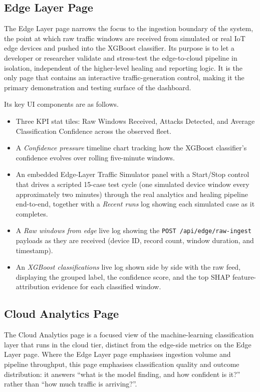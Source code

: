 \subsection{Edge Layer Page}\label{sec:dash_edge}

The Edge Layer page narrows the focus to the ingestion boundary of the system, the point at which raw traffic windows are received from simulated or real IoT edge devices and pushed into the XGBoost classifier. Its purpose is to let a developer or researcher validate and stress-test the edge-to-cloud pipeline in isolation, independent of the higher-level healing and reporting logic. It is the only page that contains an interactive traffic-generation control, making it the primary demonstration and testing surface of the dashboard.

Its key UI components are as follows.
\begin{itemize}
	\item Three KPI stat tiles: Raw Windows Received, Attacks Detected, and Average Classification Confidence across the observed fleet.
	\item A \textit{Confidence pressure} timeline chart tracking how the XGBoost classifier's confidence evolves over rolling five-minute windows.
	\item An embedded Edge-Layer Traffic Simulator panel with a Start/Stop control that drives a scripted 15-case test cycle (one simulated device window every approximately two minutes) through the real analytics and healing pipeline end-to-end, together with a \textit{Recent runs} log showing each simulated case as it completes.
	\item A \textit{Raw windows from edge} live log showing the \texttt{POST /api/edge/raw-ingest} payloads as they are received (device ID, record count, window duration, and timestamp).
	\item An \textit{XGBoost classifications} live log shown side by side with the raw feed, displaying the grouped label, the confidence score, and the top SHAP feature-attribution evidence for each classified window.
\end{itemize}

\subsection{Cloud Analytics Page}\label{sec:dash_cloud_analytics}

The Cloud Analytics page is a focused view of the machine-learning classification layer that runs in the cloud tier, distinct from the edge-side metrics on the Edge Layer page. Where the Edge Layer page emphasises ingestion volume and pipeline throughput, this page emphasises classification quality and outcome distribution: it answers ``what is the model finding, and how confident is it?'' rather than ``how much traffic is arriving?''.

